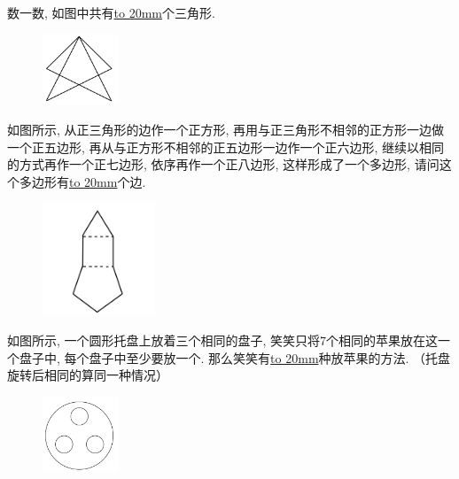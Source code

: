 \item {
    数一数, 如图中共有\underline{\hbox to 20mm{}}个三角形.
    \begin{figure}[H] 
        \centering
        \includegraphics[width=0.2\textwidth]{./pics/Chapter_6/2015_2.png}
    \end{figure}
}

\item {
    如图所示, 从正三角形的边作一个正方形, 再用与正三角形不相邻的正方形一边做一个正五边形, 再从与正方形不相邻的正五边形一边作一个正六边形, 继续以相同的方式再作一个正七边形, 依序再作一个正八边形, 这样形成了一个多边形, 请问这个多边形有\underline{\hbox to 20mm{}}个边. 
    \begin{figure}[H] 
        \centering
        \includegraphics[width=0.3\textwidth]{./pics/Chapter_6/2015_3.png}
    \end{figure}
}

\item {
    如图所示, 一个圆形托盘上放着三个相同的盘子, 笑笑只将7个相同的苹果放在这一个盘子中, 每个盘子中至少要放一个. 那么笑笑有\underline{\hbox to 20mm{}}种放苹果的方法. （托盘旋转后相同的算同一种情况）
    \begin{figure}[H] 
        \centering
        \includegraphics[width=0.2\textwidth]{./pics/Chapter_6/2015_4.png}
    \end{figure}
}

